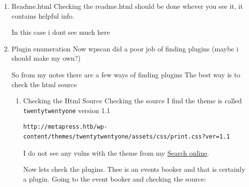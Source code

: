 \documentclass[11pt]{article}
\begin{document}
\begin{enumerate}
\begin{verbatim}
[i] The main theme could not be detected.


[i] No plugins Found.


[i] No Config Backups Found.

[!] No WPScan API Token given, as a result vulnerability data has not been output.
[!] You can get a free API token with 25 daily requests by registering at https://wpscan.com/register

[+] Finished: Tue Dec 13 22:31:58 2022
[+] Requests Done: 168
[+] Cached Requests: 3
[+] Data Sent: 49.928 KB
[+] Data Received: 131.045 KB
[+] Memory used: 207.496 MB
[+] Elapsed time: 00:00:07

\end{verbatim}

Wp scan has found some usfule things like the fact \texttt{/readme.html} is there.
\item Readme.html
\label{sec:org9e8cdea}
Checking the readme.html should be done whever you see it, it contains helpful info.

In this case i dont see much here

\item Plugin enumeration
\label{sec:org4133c8a}
Now wpscan did a poor job of finding plugins (maybe i should make my own?)

So from my notes there are a few ways of finding plugins
The best way is to check the html source

\begin{enumerate}
\item Checking the Html Source
\label{sec:org515b544}
Checking the source I find the theme is called \texttt{twentytwentyone} version 1.1
\begin{verbatim}
http://metapress.htb/wp-content/themes/twentytwentyone/assets/css/print.css?ver=1.1
\end{verbatim}
I do not see any vulns with the theme from my \href{https://wpscan.com/theme/valentinus-twenty-twenty-one}{Search online}.

Now lets check the plugins.
Thee is an events booker and that is certainly a plugin.
Going to the event booker and checking the source:


\end{enumerate}
\end{enumerate}
\end{document}

